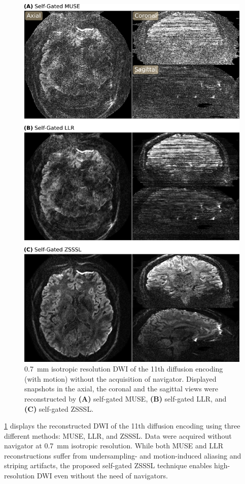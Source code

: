 \documentclass[journal,twoside,web]{ieeecolor}
\begin{document}
	\begin{figure}
		\centering
		\includegraphics[width=\columnwidth]{../figures/fig6.png}
		\caption{\SI{0.7}{\milli\meter} isotropic resolution DWI
			of the 11th diffusion encoding (with motion)
			without the acquisition of navigator.
			Displayed snapshots in the axial, the coronal and the sagittal views
			were reconstructed by \textbf{(A)} self-gated MUSE,
			\textbf{(B)} self-gated LLR, and
			\textbf{(C)} self-gated ZSSSL.}
		\label{FIG:MOTION_PROS}
	\end{figure}

	\cref{FIG:MOTION_PROS} displays the reconstructed DWI of the 11th diffusion encoding
	using three different methods: MUSE, LLR, and ZSSSL.
	Data were acquired without navigator at \SI{0.7}{\milli\meter} isotropic resolution.
	While both MUSE and LLR reconstructions suffer from
	undersampling- and motion-induced aliasing and striping artifacts,
	the proposed self-gated ZSSSL technique enables high-resolution DWI even
	without the need of navigators.
\end{document}
